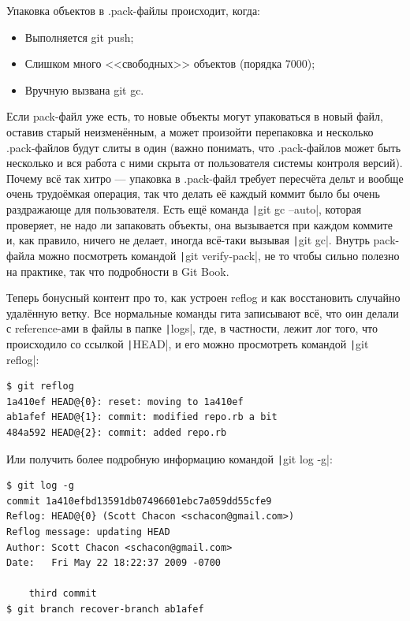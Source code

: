 \documentclass{../../text-style}
\begin{document}
Упаковка объектов в .pack-файлы происходит, когда:
\begin{itemize}
	\item Выполняется git push;
	\item Слишком много <<свободных>> объектов (порядка 7000);
	\item Вручную вызвана git gc.
\end{itemize}

Если pack-файл уже есть, то новые объекты могут упаковаться в новый файл, оставив старый неизменённым, а может произойти перепаковка и несколько .pack-файлов будут слиты в один (важно понимать, что .pack-файлов может быть несколько и вся работа с ними скрыта от пользователя системы контроля версий). Почему всё так хитро --- упаковка в .pack-файл требует пересчёта дельт и вообще очень трудоёмкая операция, так что делать её каждый коммит было бы очень раздражающе для пользователя. Есть ещё команда \texttt|git gc --auto|, которая проверяет, не надо ли запаковать объекты, она вызывается при каждом коммите и, как правило, ничего не делает, иногда всё-таки вызывая \texttt|git gc|. Внутрь pack-файла можно посмотреть командой \texttt|git verify-pack|, не то чтобы сильно полезно на практике, так что подробности в Git Book.

Теперь бонусный контент про то, как устроен reflog и как восстановить случайно удалённую ветку. Все нормальные команды гита записывают всё, что оин делали с reference-ами в файлы в папке \texttt|logs|, где, в частности, лежит лог того, что происходило со ссылкой \texttt|HEAD|, и его можно просмотреть командой \texttt|git reflog|:

\begin{verbatim}
$ git reflog
1a410ef HEAD@{0}: reset: moving to 1a410ef
ab1afef HEAD@{1}: commit: modified repo.rb a bit
484a592 HEAD@{2}: commit: added repo.rb
\end{verbatim}

Или получить более подробную информацию командой \texttt|git log -g|:

\begin{verbatim}
$ git log -g
commit 1a410efbd13591db07496601ebc7a059dd55cfe9
Reflog: HEAD@{0} (Scott Chacon <schacon@gmail.com>)
Reflog message: updating HEAD
Author: Scott Chacon <schacon@gmail.com>
Date:   Fri May 22 18:22:37 2009 -0700

    third commit
$ git branch recover-branch ab1afef
\end{verbatim}
\end{document}
